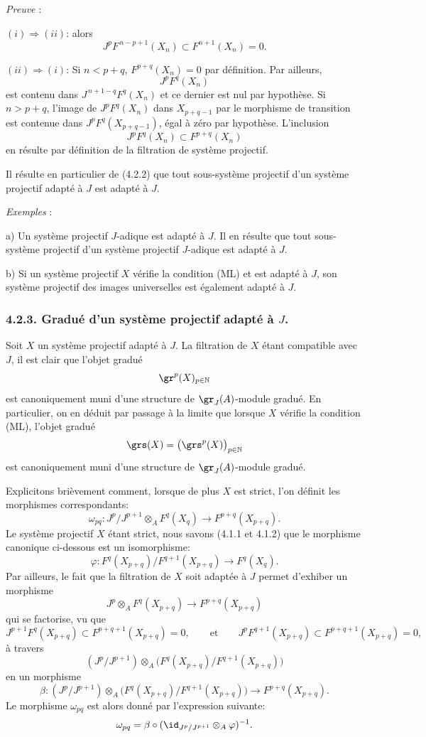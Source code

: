 \emph{Preuve} :

\((i)\Rightarrow(ii)\): alors
\[
J^pF^{\,n-p+1}(X_n)\subset F^{n+1}(X_n)=0.
\]

\((ii)\Rightarrow(i)\): Si \(n<p+q\), \(F^{p+q}(X_n)=0\) par définition. Par
ailleurs,
\[
J^pF^q(X_n)
\]
est contenu dans \(J^{\,n+1-q}F^q(X_n)\) et ce dernier est nul par hypothèse. Si \(n>p+q\), l'image de \(J^pF^q(X_n)\) dans \(X_{p+q-1}\) par le morphisme de transition est contenue dans \(J^pF^q(X_{p+q-1})\), égal à zéro par hypothèse. L'inclusion
\[
J^pF^q(X_n)\subset F^{p+q}(X_n)
\]
en résulte par définition de la filtration de système projectif.

Il résulte en particulier de (4.2.2) que tout sous-système projectif d'un système projectif adapté à \(J\) est adapté à \(J\).

\emph{Exemples} :

a) Un système projectif \(J\)-adique est adapté à \(J\). Il en résulte que tout sous-système projectif d'un système projectif \(J\)-adique est adapté à \(J\).

b) Si un système projectif \(X\) vérifie la condition (ML) et est adapté à \(J\), son système projectif des images universelles est également adapté à \(J\).

\subsubsection*{4.2.3. Gradué d'un système projectif adapté à \(J\).}
Soit \(X\) un système projectif adapté à \(J\). La filtration de \(X\) étant compatible avec \(J\), il est clair que l'objet gradué
\[
\gr^p(X)_{p\in\mathbb{N}}
\]
est canoniquement muni d'une structure de \(\gr_J(A)\)-module gradué. En particulier, on en déduit par passage à la limite que lorsque \(X\) vérifie la condition (ML), l'objet gradué
\[
\grs(X)=\bigl(\grs^p(X)\bigr)_{p\in\mathbb{N}}
\]
est canoniquement muni d'une structure de \(\gr_J(A)\)-module gradué.

Explicitons brièvement comment, lorsque de plus \(X\) est strict, l'on définit les morphismes correspondants:
\[
\omega_{pq}: J^p/J^{p+1}\otimes_A F^q(X_q)\longrightarrow F^{p+q}(X_{p+q}).
\]
Le
système projectif \(X\) étant strict, nous savons (4.1.1 et 4.1.2) que le morphisme canonique ci-dessous est un isomorphisme:
\[
\varphi:F^q(X_{p+q})/F^{q+1}(X_{p+q})\longrightarrow F^q(X_q).
\]
Par ailleurs, le fait que la filtration de \(X\) soit adaptée à \(J\) permet d'exhiber un morphisme
\[
J^p\otimes_A F^q(X_{p+q})\longrightarrow F^{p+q}(X_{p+q})
\]
qui se factorise, vu que
\[
J^{p+1}F^q(X_{p+q})\subset F^{p+q+1}(X_{p+q})=0,\qquad\text{et}\qquad
J^pF^{q+1}(X_{p+q})\subset F^{p+q+1}(X_{p+q})=0,
\]
à travers
\[
(J^p/J^{p+1})\otimes_A
\bigl(F^q(X_{p+q})/F^{q+1}(X_{p+q})\bigr)
\]
en un morphisme
\[
\beta:(J^p/J^{p+1})\otimes_A
\bigl(F^q(X_{p+q})/F^{q+1}(X_{p+q})\bigr)
\longrightarrow F^{p+q}(X_{p+q}).
\]
Le morphisme \(\omega_{pq}\) est alors donné par l'expression suivante:
\[
\omega_{pq}=\beta\circ(\id_{J^p/J^{p+1}}\otimes_A\varphi)^{-1}.
\]

